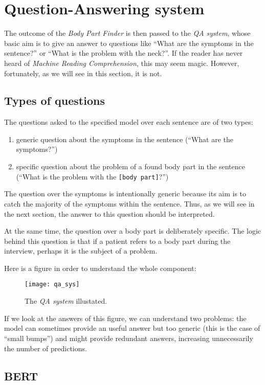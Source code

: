 \section{Question-Answering system}
\label{sec:qa_system}
The outcome of the \textit{Body Part Finder} is then passed to the \textit{QA system}, whose basic aim is to give an answer to questions like ``What are the symptoms in the sentence?'' or ``What is the problem with the neck?''. If the reader has never heard of \textit{Machine Reading Comprehension}, this may seem magic. However, fortunately, as we will see in this section, it is not.

\subsection{Types of questions}
The questions asked to the specified model over each sentence are of two types:
\begin{enumerate}
  \item generic question about the symptoms in the sentence (``What are the symptoms?'')
  \item specific question about the problem of a found body part in the sentence (``What is the problem with the \texttt{[body part]}?'')
\end{enumerate}

The question over the symptoms is intentionally generic because its aim is to catch the majority of the symptoms within the sentence. Thus, as we will see in the next section, the answer to this question should be interpreted.

At the same time, the question over a body part is deliberately specific. The logic behind this question is that if a patient refers to a body part during the interview, perhaps it is the subject of a problem.

Here is a figure in order to understand the whole component:

\begin{figure}[h]
\centering
\texttt{[image: qa\_sys]}
\caption{The \textit{QA system} illustated.}
\medskip
\end{figure}

If we look at the answers of this figure, we can understand two problems: the model can sometimes provide an useful answer but too generic (this is the case of ``small bumps'') and might provide redundant answers, increasing unnecessarily the number of predictions.

\subsection{BERT}


